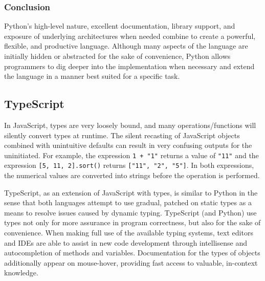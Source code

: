 \documentclass{article}
\begin{document}
\subsubsection{Conclusion}

Python's high-level nature, excellent documentation, library support, and exposure of underlying architectures when needed
combine to create a powerful, flexible, and productive language. Although many aspects of the language are initially
hidden or abstracted for the sake of convenience, Python allows programmers to dig deeper into the implementation
when necessary and extend the language in a manner best suited for a specific task.

\subsection{TypeScript}

In JavaScript, types are very loosely bound, and many operations/functions will silently convert types
at runtime. The silent recasting of JavaScript objects combined with unintuitive defaults
can result in very confusing outputs for the uninitiated. For example, the expression \texttt{1 + "1"}
returns a value of \texttt{"11"} and the expression \texttt{[5, 11, 2].sort()} returns
\texttt{["11", "2", "5"]}. In both expressions, the numerical values are converted into strings before the operation is performed.

TypeScript, as an extension of JavaScript with types, is similar to Python in the sense that both
languages attempt to use gradual, patched on static types as a means to resolve issues caused
by dynamic typing. TypeScript (and Python) use types not only for more assurance in program correctness,
but also for the sake of convenience. When making full use of the available typing systems, text editors
and IDEs are able to assist in new code development through intellisense and autocompletion of methods and variables.
Documentation for the types of objects additionally appear on mouse-hover, providing fast access to valuable, in-context knowledge.
\end{document}
